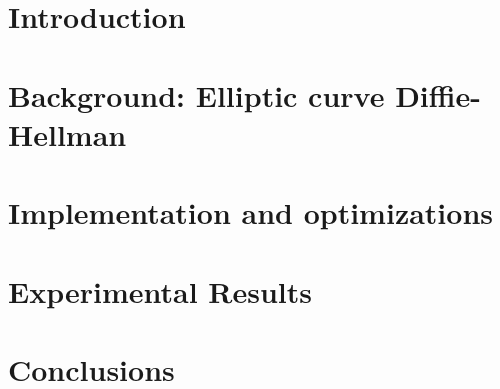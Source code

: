 


%
\maketitle
%

\begin{abstract}

\end{abstract}

\section{Introduction}\label{sec:intro}


\section{Background: Elliptic curve Diffie-Hellman}\label{sec:background}


\section{Implementation and optimizations}\label{sec:yourmethod}


\section{Experimental Results}\label{sec:exp}


\section{Conclusions}






